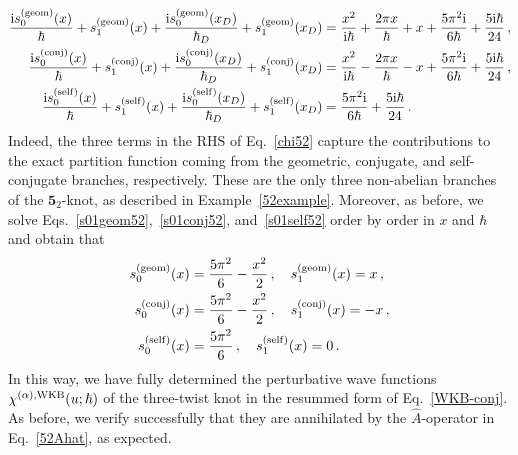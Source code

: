 \documentclass[a4paper,11pt]{article}
\theoremstyle{definition}
\newcommand\TT{{\mathbb T}}
\def\TT{\bm{5}_2}
\newcommand{\ri}{{\rm i}}
\begin{document}
\begin{subequations}
\begin{align}
  {\ri  s^{(\rm{geom})}_0(x) \over \hbar}+ s^{(\rm{geom})}_1(x) + {\ri s^{(\rm{geom})}_0(x_D) \over \hbar_D} + s^{(\rm{geom})}_1(x_D) 
  &= {x^2 \over\ri \hbar} + {2 \pi x \over\hbar} + x +{5 \pi^2 \ri \over 6 \hbar} + {5 \ri \hbar \over 24} \, , \label{s01geom52}\\
  {\ri s^{(\rm{conj})}_0(x) \over \hbar} + s^{(\rm{conj})}_1(x) + {\ri s^{(\rm{conj})}_0(x_D) \over \hbar_D} + s^{(\rm{conj})}_1(x_D) 
  &= {x^2 \over \ri \hbar} - { 2 \pi x \over\hbar}- x + {5 \pi^2 \ri \over 6 \hbar} + {5 \ri \hbar \over 24} \, , \label{s01conj52}\\
  {\ri s^{(\rm{self})}_0(x) \over \hbar} + s^{(\rm{self})}_1(x) + {\ri s^{(\rm{self})}_0(x_D) \over \hbar_D} + s^{(\rm{self})}_1(x_D) 
  &= {5 \pi^2 \ri \over 6 \hbar} + {5 \ri \hbar \over 24} \, .\label{s01self52}
\end{align}
\end{subequations}
Indeed, the three terms in the RHS of Eq.~\eqref{chi52} capture the contributions to the exact partition function coming from the geometric, conjugate, and self-conjugate branches, respectively. These are the only three non-abelian branches of the $\TT$-knot, as described in Example~\ref{52example}.
Moreover, as before, we solve Eqs.~\eqref{s01geom52},~\eqref{s01conj52}, and~\eqref{s01self52} order by order in $x$ and $\hbar$ and obtain that
\begin{subequations}
\begin{align}
  s^{(\rm{geom})}_0(x) &= \frac{5 \pi^2}{6} - \frac{x^2}{2} \, , \quad s^{(\rm{geom})}_1(x) = x \, , \label{s01geom52-new}\\
  s^{(\rm{conj})}_0(x) &= \frac{5 \pi^2}{6} - \frac{x^2}{2} \, , \quad s^{(\rm{conj})}_1(x) = -x \, , \label{s01conj52-new}\\
  s^{(\rm{self})}_0(x) &= \frac{5 \pi^2}{6} \, , \quad s^{(\rm{self})}_1(x) = 0 \, . \label{s01self52-new}
\end{align}
\end{subequations}
In this way, we have fully determined the perturbative wave functions $\chi^{(\alpha), \rm{WKB}}(u;\hbar)$ of the three-twist knot in the resummed form of Eq.~\eqref{WKB-conj}. As before, we verify successfully that they are annihilated by the $\hat A$-operator in Eq.~\eqref{52Ahat}, as expected.
\end{document}
